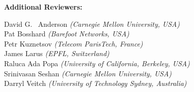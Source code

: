\documentclass[sigconf]{acmart}
\begin{document}
\begin{minipage}[t]{.3\textwidth}
{\bf Additional Reviewers:}
\end{minipage}
\begin{minipage}[t]{.9\textwidth}
David G.~ Anderson {\it (Carnegie Mellon University, USA)}\\
Pat Bosshard {\it (Barefoot Networks, USA)}\\
Petr Kuznetsov {\it (Telecom ParisTech, France)}\\
James Larus {\it (EPFL, Switzerland)}\\
Raluca Ada Popa {\it (University of California, Berkeley, USA)}\\
Srinivasan Seshan {\it (Carnegie Mellon University, USA)}\\
Darryl Veitch {\it (University of Technology Sydney, Australia)}\\
\end{minipage}
\end{document}
